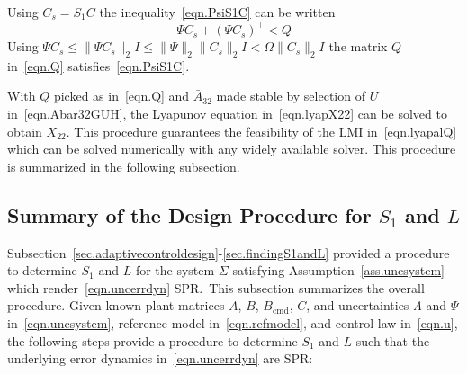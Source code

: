 \documentclass[]{../sty/aiaa-tc}
\begin{document}
  \begin{proof-dan}
    Using $C_{s}=S_{1}C$ the inequality\ \eqref{eqn.PsiS1C} can be written
    \begin{equation*}
      \Psi C_{s}+(\Psi C_{s})^{\top}<Q
    \end{equation*}
    Using $\Psi C_{s}\leq\|\Psi C_{s}\|_{2}I\leq\|\Psi\|_{2}\|C_{s}\|_{2}I<\Omega\|C_{s}\|_{2}I$ the matrix $Q$ in\ \eqref{eqn.Q} satisfies\ \eqref{eqn.PsiS1C}.
  \end{proof-dan}

  With $Q$ picked as in\ \eqref{eqn.Q} and $\bar{A}_{32}$ made stable by selection of $U$ in\ \eqref{eqn.Abar32GUH}, the Lyapunov equation in\ \eqref{eqn.lyapX22} can be solved to obtain $X_{22}$.
  This procedure guarantees the feasibility of the LMI in\ \eqref{eqn.lyapalQ} which can be solved numerically with any widely available solver.
  This procedure is summarized in the following subsection.

  \subsection{Summary of the Design Procedure for \texorpdfstring{$S_{1}$ and $L$}{S1 and L}}

  Subsection~\ref{sec.adaptivecontroldesign}-\ref{sec.findingS1andL} provided a procedure to determine $S_{1}$ and $L$ for the system $\Sigma$ satisfying Assumption~\ref{ass.uncsystem} which render\ \eqref{eqn.uncerrdyn} SPR.\
  This subsection summarizes the overall procedure.
  Given known plant matrices $A$, $B$, $B_{\text{cmd}}$, $C$, and uncertainties $\Lambda$ and $\Psi$ in\ \eqref{eqn.uncsystem}, reference model in\ \eqref{eqn.refmodel}, and control law in\ \eqref{eqn.u}, the following steps provide a procedure to determine $S_{1}$ and $L$ such that the underlying error dynamics in\ \eqref{eqn.uncerrdyn} are SPR:\@
\end{document}
